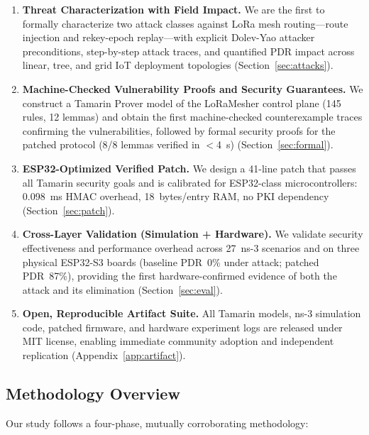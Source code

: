 \documentclass[10pt,journal,compsoc]{IEEEtran}
\begin{document}
\begin{enumerate}
  \item \textbf{Threat Characterization with Field Impact.}
    We are the first to formally characterize two attack classes
    against LoRa mesh routing—route injection and rekey-epoch
    replay—with explicit Dolev-Yao attacker preconditions,
    step-by-step attack traces, and quantified PDR impact across
    linear, tree, and grid IoT deployment topologies
    (Section~\ref{sec:attacks}).

  \item \textbf{Machine-Checked Vulnerability Proofs and Security
    Guarantees.} We construct a Tamarin Prover model of the
    LoRaMesher control plane (145 rules, 12 lemmas) and obtain
    the first machine-checked counterexample traces confirming the
    vulnerabilities, followed by formal security proofs for the
    patched protocol (8/8 lemmas verified in $<$4~s)
    (Section~\ref{sec:formal}).

  \item \textbf{ESP32-Optimized Verified Patch.} We design a
    41-line patch that passes all Tamarin security goals and is
    calibrated for ESP32-class microcontrollers: 0.098~ms HMAC
    overhead, 18~bytes/entry RAM, no PKI dependency
    (Section~\ref{sec:patch}).

  \item \textbf{Cross-Layer Validation (Simulation + Hardware).}
    We validate security effectiveness and performance overhead
    across 27~ns-3 scenarios and on three physical ESP32-S3 boards
    (baseline PDR~0\% under attack; patched PDR~87\%),
    providing the first hardware-confirmed evidence of both the
    attack and its elimination (Section~\ref{sec:eval}).

  \item \textbf{Open, Reproducible Artifact Suite.} All Tamarin
    models, ns-3 simulation code, patched firmware, and hardware
    experiment logs are released under MIT license, enabling
    immediate community adoption and independent replication
    (Appendix~\ref{app:artifact}).
\end{enumerate}

\subsection{Methodology Overview}
\label{sec:methodology}

Our study follows a four-phase, mutually corroborating methodology:
\end{document}
